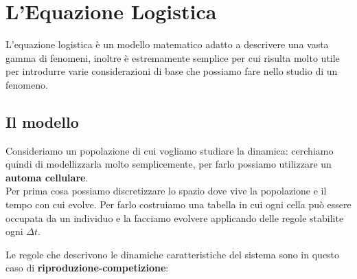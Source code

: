 \section{L'Equazione Logistica}

L'equazione logistica è un modello matematico adatto a descrivere una vasta gamma di fenomeni, inoltre è estremamente semplice per cui risulta molto utile per introdurre varie considerazioni di base che possiamo fare nello studio di un fenomeno.

\subsection{Il modello}

Consideriamo un popolazione di cui vogliamo studiare la dinamica: cerchiamo quindi di modellizzarla molto semplicemente, per farlo possiamo utilizzare un \textbf{automa cellulare}.\\

Per prima cosa possiamo discretizzare lo spazio dove vive la popolazione e il tempo con cui evolve. Per farlo costruiamo una tabella in cui ogni cella può essere occupata da un individuo e la facciamo evolvere applicando delle regole stabilite ogni $\Delta t$.
\begin{center}
\end{center}
Le regole che descrivono le dinamiche caratteristiche del sistema sono in questo caso di \textbf{riproduzione-competizione}:

